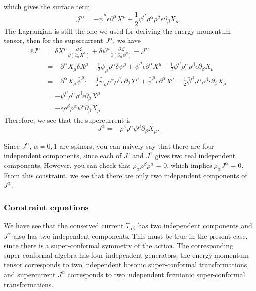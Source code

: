 \documentclass[graybox,envcountchap,sectrefs]{svmono}
\begin{document}
which gives the surface term
\begin{equation}
\mathcal{J}^{\alpha}=- \bar{\psi}^{\mu} \epsilon \partial^{\alpha} X^{\mu}
+\frac{1}{2}\bar{\psi}^{\mu} \rho^{\alpha} \rho^{\beta} \epsilon \partial_{\beta} X_{\mu}.
\end{equation}
The Lagrangian is still the one we used for deriving the energy-momentum tensor, then for the supercurrent $J^{\alpha}$, we have
\begin{equation}
\begin{aligned}
\bar{\epsilon} J^{\alpha} &=\delta X^{\mu} \frac{\partial \mathcal{L}}{\partial\left(\partial_{\alpha} X^{\mu}\right)}+\delta \psi^{\mu} \frac{\partial \mathcal{L}}{\partial\left(\partial_{\alpha} \psi^{\mu}\right)}-\mathcal{J}^{\alpha} \\
&=- \partial^{\alpha} X_{\mu} \delta X^{\mu}-\frac{1}{2}\bar{\psi}_{\mu} \rho^{\alpha} \delta \psi^{\mu}
+ \bar{\psi}^{\mu} \epsilon \partial^{\alpha} X^{\mu}
-\frac{1}{2}\bar{\psi}^{\mu} \rho^{\alpha} \rho^{\beta} \epsilon \partial_{\beta} X_{\mu} \\
&=-\partial^{\alpha} X_{\mu} \bar{\psi}^{\mu} \epsilon
-\frac{1}{2}\bar{\psi}_{\mu} \rho^{\alpha} \rho^{\beta} \epsilon \partial_{\beta} X^{\mu}
+ \bar{\psi}^{\mu} \epsilon \partial^{\alpha} X^{\mu}
-\frac{1}{2}\bar{\psi}^{\mu} \rho^{\alpha} \rho^{\beta} \epsilon \partial_{\beta} X_{\mu} \\
&=-\bar{\psi}^{\mu} \rho^{\alpha} \rho^{\beta} \epsilon \partial_{\beta} X^{\mu} \\
&=- \bar{\epsilon} \rho^{\beta} \rho^{\alpha} \psi^{\mu} \partial_{\beta} X_{\mu}
\end{aligned}
\end{equation}
Therefore, we see that the supercurrent is
\begin{equation}\boxed{
J^{\alpha}=	- \rho^{\beta} \rho^{\alpha} \psi^{\mu} \partial_{\beta} X_{\mu}.
}
\end{equation}

Since $J^{\alpha}$, $\alpha=0,1$ are spinors, you can naively say that there are four independent components, since each of $J^0$ and $J^1$ gives two real independent components. 
However, you can check that $\rho_{\alpha}\rho^{\beta}\rho^{\alpha}=0$, which implies $\rho_{\alpha}J^{\alpha}=0$. From this constraint, we see that there are only two independent components of $J^{\alpha}$.




\subsubsection*{Constraint equations}
We have see that the conserved current $T_{\alpha\beta}$ has two independent components and $J^{\alpha}$ also has two independent components. 
This must be true in the present case, since there is a super-conformal symmetry of the action. 
The corresponding super-conformal algebra has four independent generators, the energy-momentum tensor corresponds to two independent bosonic super-conformal transformations, and supercurrent $J^{\alpha}$ corresponds to two independent fermionic super-conformal transformations.
\end{document}
